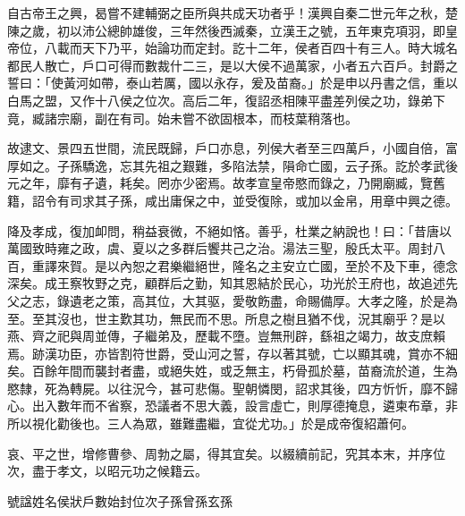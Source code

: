 
\begin{pinyinscope}
自古帝王之興，曷嘗不建輔弼之臣所與共成天功者乎！漢興自秦二世元年之秋，楚陳之歲，初以沛公總帥雄俊，三年然後西滅秦，立漢王之號，五年東克項羽，即皇帝位，八載而天下乃平，始論功而定封。訖十二年，侯者百四十有三人。時大城名都民人散亡，戶口可得而數裁什二三，是以大侯不過萬家，小者五六百戶。封爵之誓曰：「使黃河如帶，泰山若厲，國以永存，爰及苗裔。」於是申以丹書之信，重以白馬之盟，又作十八侯之位次。高后二年，復詔丞相陳平盡差列侯之功，錄弟下竟，臧諸宗廟，副在有司。始未嘗不欲固根本，而枝葉稍落也。

故逮文、景四五世間，流民既歸，戶口亦息，列侯大者至三四萬戶，小國自倍，富厚如之。子孫驕逸，忘其先祖之艱難，多陷法禁，隕命亡國，云子孫。訖於孝武後元之年，靡有孑遺，耗矣。罔亦少密焉。故孝宣皇帝愍而錄之，乃開廟臧，覽舊籍，詔令有司求其子孫，咸出庸保之中，並受復除，或加以金帛，用章中興之德。

降及孝成，復加卹問，稍益衰微，不絕如悋。善乎，杜業之納說也！曰：「昔唐以萬國致時雍之政，虞、夏以之多群后饗共己之治。湯法三聖，殷氏太平。周封八百，重譯來賀。是以內恕之君樂繼絕世，隆名之主安立亡國，至於不及下車，德念深矣。成王察牧野之克，顧群后之勤，知其恩結於民心，功光於王府也，故追述先父之志，錄遺老之策，高其位，大其驱，愛敬飭盡，命賜備厚。大孝之隆，於是為至。至其沒也，世主歎其功，無民而不思。所息之樹且猶不伐，況其廟乎？是以燕、齊之祀與周並傳，子繼弟及，歷載不墮。豈無刑辟，繇祖之竭力，故支庶賴焉。跡漢功臣，亦皆割符世爵，受山河之誓，存以著其號，亡以顯其魂，賞亦不細矣。百餘年間而襲封者盡，或絕失姓，或乏無主，朽骨孤於墓，苗裔流於道，生為愍隸，死為轉屍。以往況今，甚可悲傷。聖朝憐閔，詔求其後，四方忻忻，靡不歸心。出入數年而不省察，恐議者不思大義，設言虛亡，則厚德掩息，遴柬布章，非所以視化勸後也。三人為眾，雖難盡繼，宜從尤功。」於是成帝復紹蕭何。

哀、平之世，增修曹參、周勃之屬，得其宜矣。以綴續前記，究其本末，并序位次，盡于孝文，以昭元功之候籍云。

號諡姓名侯狀戶數始封位次子孫曾孫玄孫


\end{pinyinscope}